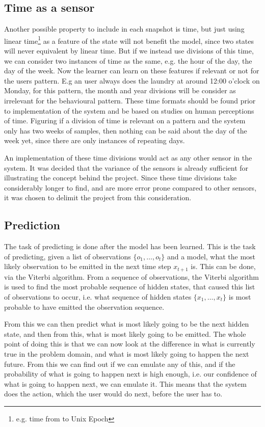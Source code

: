 \subsection{Time as a sensor}
Another possible property to include in each snapshot is time, but just using linear time\footnote{e.g. time from to Unix Epoch\cite{unix_epoch}} as a feature of the state will not benefit the model, since two states will never equivalent by linear time. But if we instead use divisions of this time, we can consider two instances of time as the same, e.g. the hour of the day, the day of the week. Now the learner can learn on these features if relevant or not for the users pattern. E.g an user always does the laundry at around 12:00 o'clock on Monday, for this pattern, the month and year divisions will be consider as irrelevant for the behavioural pattern. These time formats should be found prior to implementation of the system and be based on studies on human perceptions of time. Figuring if a division of time is relevant on a pattern and the system only has two weeks of samples, then nothing can be said about the day of the week yet, since there are only instances of repeating days.

An implementation of these time divisions would act as any other sensor in the system. It was decided that the variance of the sensors is already sufficient for illustrating the concept behind the project. Since these time divisions take considerably longer to find, and are more error prone compared to other sensors, it was chosen to delimit the project from this consideration.

\subsection{Prediction}\label{sub:Prediction}
The task of predicting is done after the model has been learned. This is the task of predicting, given a list of observations $\{o_1,\dots,o_t\}$ and a model, what the most likely observation to be emitted in the next time step $x_{t+1}$ is. This can be done, via the Viterbi algorithm\cite{russell2010artificial}. From a sequence of observations, the Viterbi algorithm is used to find the most probable sequence of hidden states, that caused this list of observations to occur, i.e. what sequence of hidden states $\{x_1,\dots,x_t\}$ is most probable to have emitted the observation sequence.

From this we can then predict what is most likely going to be the next hidden state, and then from this, what is most likely going to be emitted. The whole point of doing this is that we can now look at the difference in what is currently true in the problem domain, and what is most likely going to happen the next future. From this we can find out if we can emulate any of this, and if the probability of what is going to happen next is high enough, i.e. our confidence of what is going to happen next, we can emulate it. This means that the system does the action, which the user would do next, before the user has to.

